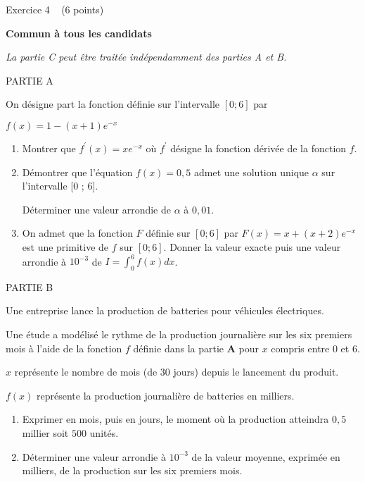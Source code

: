 
%
\begin{h2}Exercice 4   (6 points)\end{h2}
\textbf{Commun à tous les candidats}
\par
\textit{La partie C peut être traitée indépendamment des parties A et B.}
\begin{h3}PARTIE A\end{h3}
On désigne part la fonction définie sur l'intervalle $\left[0 ; 6\right]$ par
\par
$f\left(x\right)=1-\left(x+1\right)e^{- x}$
\begin{enumerate}
     \item
     Montrer que $f^{\prime}\left(x\right)=xe^{- x}$ où $f^{\prime}$ désigne la fonction dérivée de la fonction $f$.
     \item
     Démontrer que l'équation $f\left(x\right)=0,5$ admet une solution unique $\alpha $ sur l'intervalle [0 ; 6].
     \par
     Déterminer une valeur arrondie de $\alpha $ à $0,01$.
     \item
     On admet que la fonction $F$ définie sur $\left[0 ; 6\right]$ par $F\left(x\right)=x+\left(x+2\right)e^{- x}$ est une primitive de $f$ sur $\left[0 ; 6\right]$. Donner la valeur exacte puis une valeur arrondie à $10^{-3}$ de $I=\int_{0}^{6} f\left(x\right)dx$.
\end{enumerate}
\begin{h3}PARTIE B\end{h3}
Une entreprise lance la production de batteries pour véhicules électriques.
\par
Une étude a modélisé le rythme de la production journalière sur les six premiers mois à l'aide de la fonction $f$ définie dans la partie \textbf{A} pour $x$ compris entre 0 et 6.
\par
$x$ représente le nombre de mois (de 30 jours) depuis le lancement du produit.
\par
$f\left(x\right)$ représente la production journalière de batteries en milliers.
\begin{enumerate}
     \item
     Exprimer en mois, puis en jours, le moment où la production atteindra $0,5$ millier soit $500$ unités.
     \item
     Déterminer une valeur arrondie à $10^{-3}$ de la valeur moyenne, exprimée en milliers, de la production sur les six premiers mois.
\end{enumerate}
